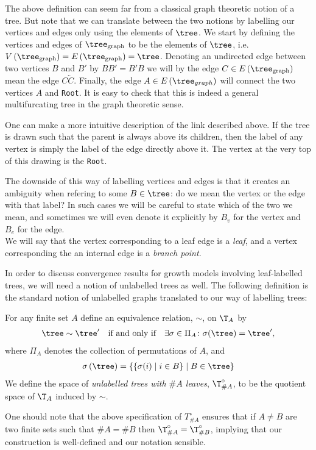 The above definition can seem far from a classical graph theoretic notion of a tree.
But note that we can translate between the two notions by labelling our vertices and edges only using the elements of $\tree$.
We start by defining the vertices and edges of $\tree_\text{graph}$ to be the elements of $\tree$, i.e.\ $V \left( \tree_\text{graph} \right) = E \left( \tree_\text{graph} \right) = \tree$.
Denoting an undirected edge between two vertices $B$ and $B'$ by $BB' = B'B$ we will by the edge $C \in E \left( \tree_\text{graph} \right)$ mean the edge $C\overleftarrow{C}$. 
Finally, the edge $A \in E\left( \tree_{graph} \right)$ will connect the two vertices $A$ and \verb|Root|.
It is easy to check that this is indeed a general multifurcating tree in the graph theoretic sense.

One can make a more intuitive description of the link described above.
If the tree is drawn such that the parent is always above its children, then the label of any vertex is simply the label of the edge directly above it.
The vertex at the very top of this drawing is the \verb|Root|.

The downside of this way of labelling vertices and edges is that it creates an ambiguity when refering to some $B \in \tree$: do we mean the vertex or the edge with that label?
In such cases we will be careful to state which of the two we mean, and sometimes we will even denote it explicitly by $B_v$ for the vertex and $B_e$ for the edge. \\
We will say that the vertex corresponding to a leaf edge is a \textit{leaf}, and a vertex corresponding the an internal edge is a \textit{branch point}. 

In order to discuss convergence results for growth models involving leaf-labelled trees, we will need a notion of unlabelled trees as well.
The following definition is the standard notion of unlabelled graphs translated to our way of labelling trees:
%
\begin{defi}\label{unlabelledtrees}
  For any finite set $A$ define an equivalence relation, $\sim$, on $\T_A$ by
  \begin{align}
    \tree \sim \tree' \quad \text{if and only if} \quad \exists \sigma \in \Pi_A \colon \sigma( \tree ) = \tree',
    \label{equiv_unlabelledtrees}
  \end{align}
  where $\Pi_A$ denotes the collection of permutations of $A$, and
  \begin{align}
    \sigma \left( \tree \right)
    = \left\{ \left\{ \sigma (i) \mid i \in B \right\} \mid B \in \tree \right\}
    \label{relabelling_perm}
  \end{align}
  We define the space of \textit{unlabelled trees with $\#A$ leaves}, $\T_{\#A}^\circ$, to be the quotient space of $\T_A$ induced by $\sim$.
\end{defi}
%
One should note that the above specification of $T_{\#A}^\circ$ ensures that if $A \neq B$ are two finite sets such that $\# A = \# B$ then $\T_{\#A}^\circ = \T_{\#B}^\circ$, implying that our construction is well-defined and our notation sensible. \\

